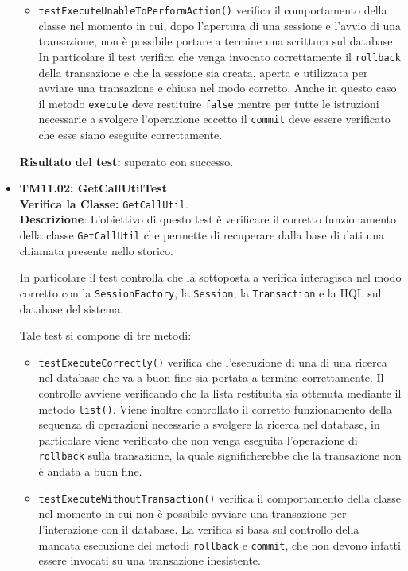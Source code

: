 \begin{itemize}
\begin{itemize}
\item \texttt{testExecuteUnableToPerformAction()} verifica il comportamento della classe nel momento in cui, dopo l'apertura di una sessione e l'avvio di una transazione, non è possibile portare a termine una scrittura sul database. In particolare il test verifica che venga invocato correttamente il \texttt{rollback} della transazione e che la sessione sia creata, aperta e utilizzata per avviare una transazione e chiusa nel modo corretto. Anche in questo caso il metodo \texttt{execute} deve restituire \texttt{false} mentre per tutte le istruzioni necessarie a svolgere l'operazione eccetto il \texttt{commit} deve essere verificato che esse siano eseguite correttamente.

\end{itemize}
\textbf{Risultato del test:} superato con successo.

\item \textbf{TM11.02: GetCallUtilTest}\\
\textbf{Verifica la Classe:} \texttt{GetCallUtil}.\\
\textbf{Descrizione}: L'obiettivo di questo test è verificare il corretto funzionamento della classe \texttt{GetCallUtil} che permette di recuperare dalla base di dati una chiamata presente nello storico.

In particolare il test controlla che la  sottoposta a verifica interagisca nel modo corretto con la \texttt{SessionFactory}, la \texttt{Session}, la \texttt{Transaction} e la  HQL sul database del sistema.

Tale test si compone di tre metodi:
\begin{itemize}
\item \texttt{testExecuteCorrectly()} verifica che l'esecuzione di una di una ricerca nel database che va a buon fine  sia portata a termine correttamente. 
Il controllo avviene verificando che la lista restituita sia ottenuta mediante il metodo \texttt{list()}. 
Viene inoltre controllato il corretto funzionamento della sequenza di operazioni necessarie a svolgere la ricerca nel database, in particolare viene verificato che non venga eseguita l'operazione di \texttt{rollback} sulla transazione, la quale significherebbe che la transazione non è andata a buon fine.

\item \texttt{testExecuteWithoutTransaction()}
verifica il comportamento della classe nel momento in cui non è possibile avviare una transazione per l'interazione con il database.
La verifica si basa sul controllo della mancata esecuzione dei metodi \texttt{rollback} e \texttt{commit}, che non devono infatti essere invocati su una transazione inesistente.


\end{itemize}
\end{itemize}
